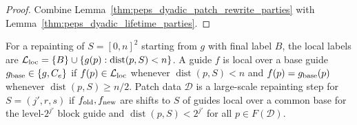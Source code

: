 \begin{proof}\leanok
    Combine Lemma~\ref{thm:peps_dyadic_patch_rewrite_parties} with
    Lemma~\ref{thm:peps_dyadic_lifetime_parties}.
\end{proof}

\begin{definition}
    \label{def:peps_dyadic_local_guides}
    \leanok
    For a repainting of $S=[0,n]^2$ starting from $g$ with final label $B$, the
    local labels are $\mathcal L_{\rm loc}=\{B\}\cup\{g(p):\operatorname{dist}(p,S)<n\}$.
    A guide $f$ is local over a base guide $g_{\rm base}\in\{g,C_e\}$ if
    $f(p)\in\mathcal L_{\rm loc}$ whenever $\operatorname{dist}(p,S)<n$ and
    $f(p)=g_{\rm base}(p)$ whenever $\operatorname{dist}(p,S)\ge n/2$. Patch data
    $\mathcal D$ is a large-scale repainting step for $S=(j',r,s)$ if
    $f_{\rm old},f_{\rm new}$ are shifts to $S$ of guides local over a common base
    for the level-$2^{j'}$ block guide and $\operatorname{dist}(p,S)<2^{j'}$ for
    all $p\in F(\mathcal D)$.
\end{definition}

